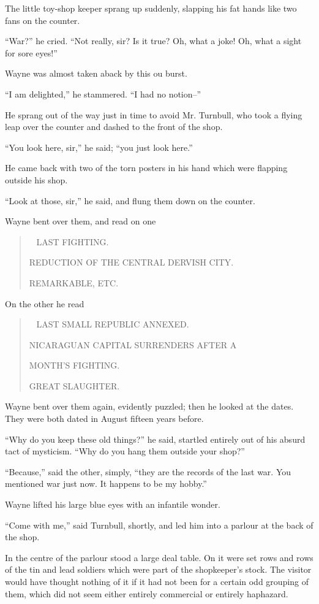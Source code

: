\documentclass{book}
\newenvironment{mdblockquote}{%
  \begin{quotation}
    \
}{%
  \end{quotation}
}
\begin{document}
The little toy-shop keeper sprang up suddenly, slapping his fat hands like two fans on the counter.

“War?” he cried. “Not really, sir? Is it true? Oh, what a joke! Oh, what a sight for sore eyes!”

Wayne was almost taken aback by this ou burst.

“I am delighted,” he stammered. “I had no notion–”

He sprang out of the way just in time to avoid Mr. Turnbull, who took a flying leap over the counter and dashed to the front of the shop.

“You look here, sir,” he said; “you just look here.”

He came back with two of the torn posters in his hand which were flapping outside his shop.

“Look at those, sir,” he said, and flung them down on the counter.

Wayne bent over them, and read on one

\begin{mdblockquote}
	LAST FIGHTING.

	REDUCTION OF THE CENTRAL DERVISH CITY.

	REMARKABLE, ETC.


\end{mdblockquote}
On the other he read

\begin{mdblockquote}
	LAST SMALL REPUBLIC ANNEXED.

	NICARAGUAN CAPITAL SURRENDERS AFTER A

	MONTH'S FIGHTING.

	GREAT SLAUGHTER.


\end{mdblockquote}
Wayne bent over them again, evidently puzzled; then he looked at the dates. They were both dated in August fifteen years before.

“Why do you keep these old things?” he said, startled entirely out of his absurd tact of mysticism. “Why do you hang them outside your shop?”

“Because,” said the other, simply, “they are the records of the last war. You mentioned war just now. It happens to be my hobby.”

Wayne lifted his large blue eyes with an infantile wonder.

“Come with me,” said Turnbull, shortly, and led him into a parlour at the back of the shop.

In the centre of the parlour stood a large deal table. On it were set rows and rows of the tin and lead soldiers which were part of the shopkeeper’s stock. The visitor would have thought nothing of it if it had not been for a certain odd grouping of them, which did not seem either entirely commercial or entirely haphazard.
\end{document}

